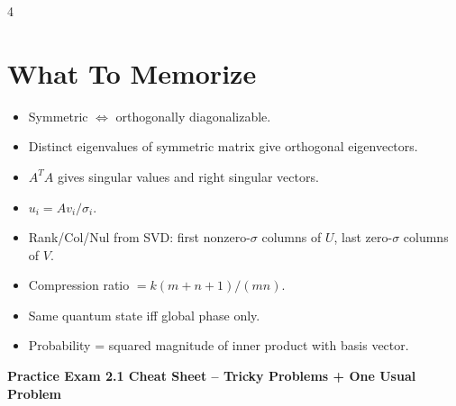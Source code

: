 \documentclass[letterpaper]{article}
\begin{document}
\begin{multicols*}{4}
\section{What To Memorize}
\begin{itemize}
\item Symmetric $\Leftrightarrow$ orthogonally diagonalizable.
\item Distinct eigenvalues of symmetric matrix give orthogonal eigenvectors.
\item $A^TA$ gives singular values and right singular vectors.
\item $u_i=Av_i/\sigma_i$.
\item Rank/Col/Nul from SVD: first nonzero-$\sigma$ columns of $U$, last zero-$\sigma$ columns of $V$.
\item Compression ratio $=k(m+n+1)/(mn)$.
\item Same quantum state iff global phase only.
\item Probability = squared magnitude of inner product with basis vector.
\end{itemize}

\end{multicols*}

\newpage
\fontsize{5}{5.2}\selectfont
\begin{center}
{\bfseries Practice Exam 2.1 Cheat Sheet -- Tricky Problems + One Usual Problem}
\end{center}
\vspace{-0.8ex}
\end{document}
